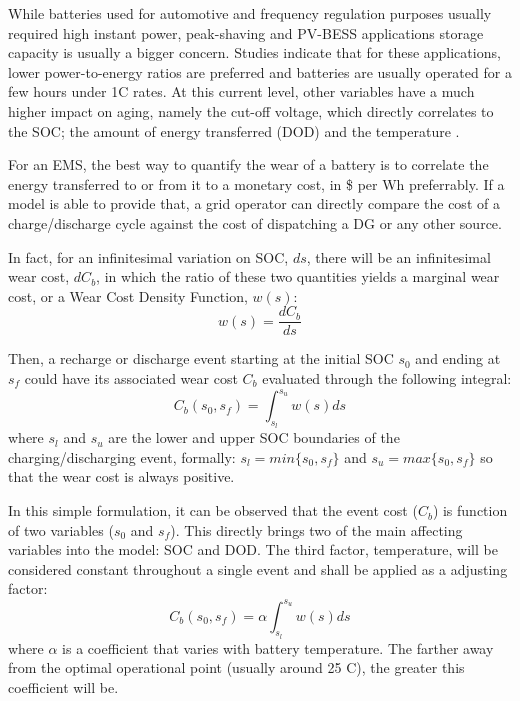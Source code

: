\documentclass{ieeeaccess}
\begin{document}
    While batteries used for automotive and frequency regulation purposes usually required high instant power, peak-shaving and \ac{PV}-\ac{BESS} applications storage capacity is usually a bigger concern. Studies \cite{hesse2017lithium, sufyan2019optimal, asano2007methodology} indicate that for these applications, lower power-to-energy ratios are preferred and batteries are usually operated for a few hours under 1C rates. At this current level, other variables have a much higher impact on aging, namely the cut-off voltage, which directly correlates to the \ac{SOC}; the amount of energy transferred (\ac{DOD}) and the temperature \cite{HAN2014}.
    
    For an \ac{EMS}, the best way to quantify the wear of a battery is to correlate the energy transferred to or from it to a monetary cost, in \$ per Wh preferrably. If a model is able to provide that, a grid operator can directly compare the cost of a charge/discharge cycle against the cost of dispatching a \ac{DG} or any other source.
    
    In fact, for an infinitesimal variation on \ac{SOC}, $ds$, there will be an infinitesimal wear cost, $dC_b$, in which the ratio of these two quantities yields a marginal wear cost, or a Wear Cost Density Function, $w(s)$:
	$$ w(s) = \frac{dC_b}{ds} $$
    
    Then, a recharge or discharge event starting at the initial \ac{SOC} $s_{0}$ and ending at $s_{f}$ could have its associated wear cost $C_b$ evaluated through the following integral:
    $$ C_b(s_{0}, s_{f}) = \int_{s_{l}}^{s_{u}}w(s)ds $$
    where $s_{l}$ and $s_{u}$ are the lower and upper \ac{SOC} boundaries of the charging/discharging event, formally: $s_{l} = min\{s_{0}, s_{f}\}$ and $s_{u} = max\{s_{0}, s_{f}\}$ so that the wear cost is always positive.
    
    In this simple formulation, it can be observed that the event cost ($C_b$) is function of two variables ($s_0$ and $s_f$). This directly brings two of the main affecting variables into the model: \ac{SOC} and \ac{DOD}. The third factor, temperature, will be considered constant throughout a single event and shall be applied as a adjusting factor:
    \begin{equation}
    	C_b(s_{0}, s_{f}) = \alpha \int_{s_{l}}^{s_{u}}w(s)ds
    	\label{eq:Cb(s0,sf)}
    \end{equation}
	where $\alpha$ is a coefficient that varies with battery temperature. The farther away from the optimal operational point (usually around 25 \textdegree C), the greater this coefficient will be.
\end{document}
